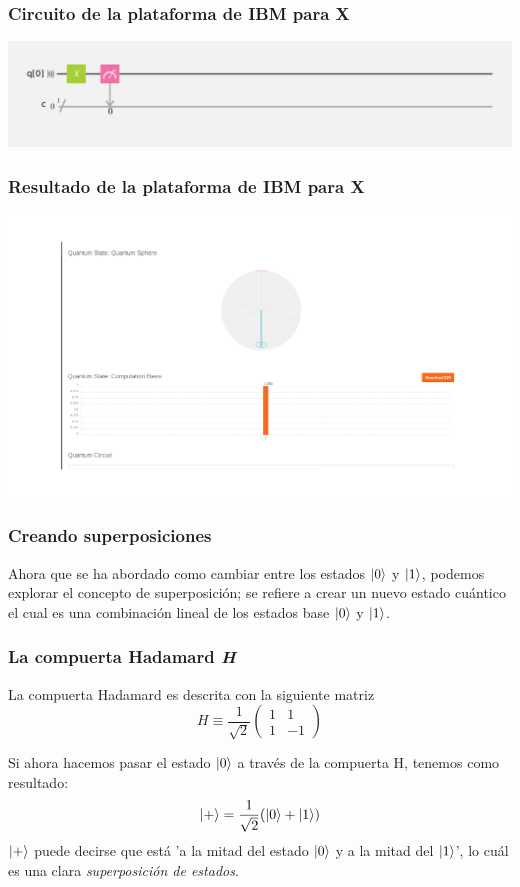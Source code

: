 \documentclass{beamer}
\begin{document}
\begin{frame}
  \frametitle{Circuito de la plataforma de IBM para X}
  \includegraphics[scale=.15]{x-gate.png}
\end{frame}


\begin{frame}
  \frametitle{Resultado de la plataforma de IBM para X}
  \includegraphics[scale=.30]{x-resultado.png}
\end{frame}

\begin{frame}
  \frametitle{Creando superposiciones}
  Ahora que se ha abordado como cambiar entre los estados $\ket{0}$ y $\ket{1}$, podemos explorar el concepto de
  superposición; se refiere a crear un nuevo estado cuántico el cual es una combinación lineal de los estados base
  $\ket{0}$ y $\ket{1}$.
\end{frame}

\begin{frame}
  \frametitle{La compuerta Hadamard \textit{H}}
  La compuerta Hadamard es descrita con la siguiente matriz
    $$H \equiv
  \frac{1}{\sqrt{2}}\begin{pmatrix}
    1 & 1 \\
    1 & -1
  \end{pmatrix}$$
\end{frame}

\begin{frame}
  Si ahora hacemos pasar el estado $\ket{0}$ a través de la compuerta H, tenemos como resultado:
  $$ \ket{+} = \frac{1}{\sqrt{2}}( \ket{0} + \ket{1} ) $$
  $\ket{+}$ puede decirse que está 'a la mitad del estado $\ket{0}$ y a la mitad del
  $\ket{1}$', lo cuál es una clara \textit{superposición de estados}.
\end{frame}
\end{document}
